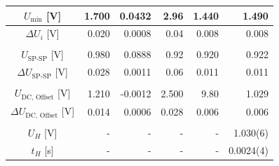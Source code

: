 \begin{table}[htbp]
\begin{tabular}{crrrrr}
\multicolumn{1}{|c|}{$U_\text{min}$ [\unit{\volt}]}        & 1.700                 & 0.0432                & 2.96                  & 1.440 & \multicolumn{1}{r|}{1.490}    \\ \hline
\multicolumn{1}{|c|}{$\Delta U_i$ [\unit{\volt}]}      & 0.020                 & 0.0008                & 0.04                  & 0.008 & \multicolumn{1}{r|}{0.008}    \\ \hline
                                    &                       &                       &                       & &       \\ \hline
\multicolumn{1}{|c|}{$U_\text{SP-SP}$ [\unit{\volt}]}         & 0.980                 & 0.0888                & 0.92       & 0.920           & \multicolumn{1}{r|}{0.922}    \\ \hline
\multicolumn{1}{|c|}{$\Delta U_\text{SP-SP}$ [\unit{\volt}]}   & 0.028                 & 0.0011                & 0.06      &0.011           & \multicolumn{1}{r|}{0.011}    \\ \hline
                                    &                       &                       &                       &                               \\ \hline
\multicolumn{1}{|c|}{$U_\text{DC, Offset}$ [\unit{\volt}]}       & 1.210                 & -0.0012               & 2.500          & 9.80       & \multicolumn{1}{r|}{1.029}    \\ \hline
\multicolumn{1}{|c|}{$\Delta U_\text{DC, Offset}$ [\unit{\volt}]} & 0.014                 & 0.0006                & 0.028         &0.006        & \multicolumn{1}{r|}{0.006}    \\ \hline
                    &                       &                       &                       &                               \\ \hline
\multicolumn{1}{|c|}{$U_H$ [\unit{\volt}]}       & -              &       -      &      -         & - & \multicolumn{1}{r|}{1.030(6)}    \\  \hline
\multicolumn{1}{|c|}{$t_H$ [\unit{\s}]}       & -              &       -      &      -         & - & \multicolumn{1}{r|}{0.0024(4)}    \\ \hline
\end{tabular}
\label{table:Signal1-4}
\end{table}

